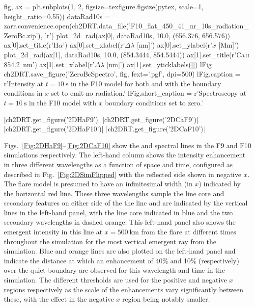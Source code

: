 \begin{pycode}[2DRT]
fig, ax = plt.subplots(1, 2, figsize=texfigure.figsize(pytex, scale=1, height_ratio=0.55))
dataRad10s = zarr.convenience.open(ch2DRT.data_file('F10_flat_450_41_nr_10s_radiation_ZeroBc.zip'), 'r')
plot_2d_rad(ax[0], dataRad10s, 10.0, (656.376, 656.576))
ax[0].set_title(r'H$\alpha$')
ax[0].set_xlabel(r'$\Delta\lambda$ [nm]')
ax[0].set_ylabel(r'$x$ [Mm]')
plot_2d_rad(ax[1], dataRad10s, 10.0, (854.3444, 854.5444))
ax[1].set_title(r'Ca\,\textsc{ii} \SI{854.2}{\nano\metre}')
ax[1].set_xlabel(r'$\Delta\lambda$ [nm]')
ax[1].set_yticklabels([])
lFig = ch2DRT.save_figure('ZeroBcSpectro', fig, fext='.pgf', dpi=500)
lFig.caption = r'Intensity at $t=\SI{10}{\second}$ in the F10 model for both \Ha{} and \CaLine{} with the boundary conditions in $x$ set to emit no radiation.'
lFig.short_caption = r'Spectroscopy at $t=\SI{10}{\second}$ in the F10 model with $x$ boundary conditions set to zero.'
\end{pycode}

\py[2DRT]|ch2DRT.get_figure('2DHaF9')|
\py[2DRT]|ch2DRT.get_figure('2DCaF9')|
\py[2DRT]|ch2DRT.get_figure('2DHaF10')|
\py[2DRT]|ch2DRT.get_figure('2DCaF10')|


Figs.~\ref{Fig:2DHaF9}--\ref{Fig:2DCaF10} show the \Ha{} and \CaLine{} spectral lines in the F9 and F10 simulations respectively.
The left-hand column shows the intensity enhancement in three different wavelengths as a function of space and time, configured as described in Fig.~\ref{Fig:2DSimFlipped} with the reflected side shown in negative $x$.
The flare model is presumed to have an infinitesimal width (in $x$) indicated by the horizontal red line.
These three wavelengths sample the line core and secondary features on either side of the the line and are indicated by the vertical lines in the left-hand panel, with the line core indicated in blue and the two secondary wavelengths in dashed orange.
This left-hand panel also shows the emergent intensity in this line at $x=\SI{500}{\kilo\metre}$ from the flare at different times throughout the simulation for the most vertical emergent ray from the simulation.
Blue and orange lines are also plotted on the left-hand panel and indicate the distance at which an enhancement of 40\% and 10\% (respectively) over the quiet boundary are observed for this wavelength and time in the simulation.
The different thresholds are used for the positive and negative $x$ regions respectively as the scale of the enhancements vary significantly between these, with the effect in the negative $x$ region being notably smaller.

